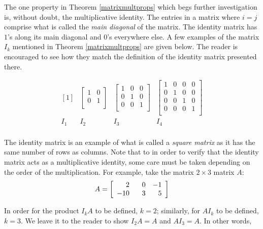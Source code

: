 \documentclass{ximera}
\begin{document}
The one property in Theorem \ref{matrixmultprops} which begs further investigation is, without doubt, the multiplicative identity.  \label{maindiagonal} The entries in a matrix where $i=j$ comprise what is called the \textit{main diagonal} of the matrix.  The identity matrix has $1$'s along its main diagonal and $0$'s everywhere else.  A few examples of the matrix $I_{k}$ mentioned in Theorem \ref{matrixmultprops} are given below.  The reader is encouraged to see how they match the definition of the identity matrix presented there.

\[ \begin{array}{ccccc}

[1] & \left[ \begin{array}{rr} 1 & 0 \\ 0 & 1 \\ \end{array} \right] & \left[ \begin{array}{rrr} 1 & 0 & 0 \\ 0 & 1 & 0 \\ 0 & 0 & 1 \\ \end{array} \right] & \left[ \begin{array}{rrrr} 1 & 0 & 0 & 0 \\ 0 & 1 & 0 & 0 \\ 0 & 0 & 1 & 0 \\  0 & 0 & 0 & 1 \\  \end{array} \right] \\
I_{1} & I_{2} & I_{3} & I_4 \\

\end{array} \]

The identity matrix is an example of what is called a \textit{square matrix} as it has the same number of rows as columns.  Note that to in order to verify that the identity matrix acts as a multiplicative identity, some care must be taken depending on the order of the multiplication.  For example, take the matrix $2 \times 3$ matrix $A$:
\[A = \left[\begin{array}{rrr} 2 & \hphantom{-}0 & -1 \\ -10 & 3 & 5 \\ \end{array} \right]\]

In order for the product $I_{k}A$ to be defined, $k = 2$;  similarly, for $AI_{k}$ to be defined, $k = 3$.  We leave it to the reader to show $I_{2}A = A$ and $AI_{3} = A$.  In other words,
\end{document}
